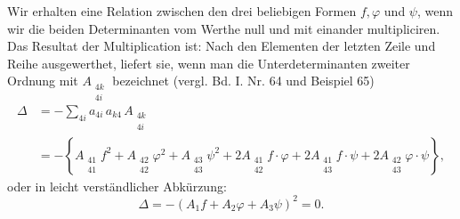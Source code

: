 Wir erhalten eine Relation zwischen den drei beliebigen Formen $f, \varphi$ und $\psi$, wenn wir die beiden Determinanten vom Werthe null
und
mit einander multipliciren. Das Resultat der Multiplication ist:
Nach den Elementen der letzten Zeile und Reihe ausgewerthet, liefert sie, wenn man die Unterdeterminanten zweiter Ordnung mit $A_{\substack{4k\\4i}}$ bezeichnet (vergl. Bd. I. Nr. 64 und Beispiel 65)
\[
\begin{aligned}
\varDelta &= -\sum_{4i} a_{4i}\,a_{k4}\,A_{\substack{4k\\4i}} \\
&= -\left\{A_{\substack{41\\41}}f^2 + A_{\substack{42\\42}}\varphi^2 + A_{\substack{43\\43}}\psi^2 + 2A_{\substack{41\\42}}f\cdot\varphi + 2A_{\substack{41\\43}}f\cdot\psi + 2A_{\substack{42\\43}}\varphi\cdot\psi\right\},
\end{aligned}
\]
oder in leicht verständlicher Abkürzung:
\[
\varDelta = -(A_1f + A_2\varphi + A_3\psi)^2 = 0.
\]


